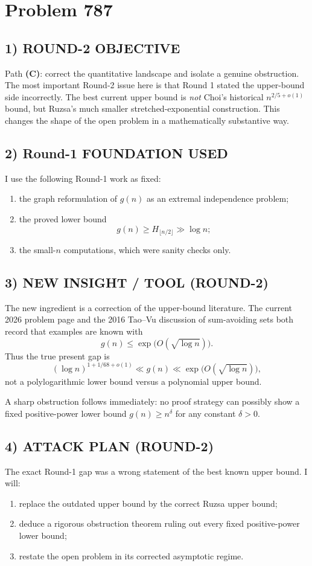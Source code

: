 \section{Problem 787}

\subsection*{1) ROUND-2 OBJECTIVE}
Path \textbf{(C)}: correct the quantitative landscape and isolate a genuine obstruction. The most important Round-2 issue here is that Round 1 stated the upper-bound side incorrectly. The best current upper bound is \emph{not} Choi's historical $n^{2/5+o(1)}$ bound, but Ruzsa's much smaller stretched-exponential construction. This changes the shape of the open problem in a mathematically substantive way.

\subsection*{2) Round-1 FOUNDATION USED}
I use the following Round-1 work as fixed:
\begin{enumerate}
\item the graph reformulation of $g(n)$ as an extremal independence problem;
\item the proved lower bound
\[
 g(n) \ge H_{\lfloor n/2 \rfloor} \gg \log n;
\]
\item the small-$n$ computations, which were sanity checks only.
\end{enumerate}

\subsection*{3) NEW INSIGHT / TOOL (ROUND-2)}
The new ingredient is a correction of the upper-bound literature. The current 2026 problem page and the 2016 Tao--Vu discussion of sum-avoiding sets both record that examples are known with
\[
 g(n) \le \exp\!\bigl(O(\sqrt{\log n})\bigr).
\]
Thus the true present gap is
\[
 (\log n)^{1+1/68+o(1)} \ll g(n) \ll \exp\!\bigl(O(\sqrt{\log n})\bigr),
\]
not a polylogarithmic lower bound versus a polynomial upper bound.

A sharp obstruction follows immediately: no proof strategy can possibly show a fixed positive-power lower bound $g(n) \ge n^\delta$ for any constant $\delta>0$.

\subsection*{4) ATTACK PLAN (ROUND-2)}
The exact Round-1 gap was a wrong statement of the best known upper bound. I will:
\begin{enumerate}
\item replace the outdated upper bound by the correct Ruzsa upper bound;
\item deduce a rigorous obstruction theorem ruling out every fixed positive-power lower bound;
\item restate the open problem in its corrected asymptotic regime.
\end{enumerate}

